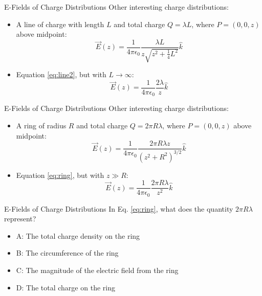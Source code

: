 \documentclass{beamer}
\begin{document}
\begin{frame}{E-Fields of Charge Distributions}
Other interesting charge distributions:
\begin{itemize}
\item A line of charge with length $L$ and total charge $Q = \lambda L$, where $P = (0,0,z)$ above midpoint:
\begin{equation}
\vec{E}(z) = \frac{1}{4\pi\epsilon_0} \frac{\lambda L}{z\sqrt{z^2 + \frac{1}{4} L^2}} \hat{k} \label{eq:line2}
\end{equation}
\item Equation \ref{eq:line2}, but with $L \rightarrow \infty$:
\begin{equation}
\vec{E}(z) = \frac{1}{4\pi\epsilon_0} \frac{2\lambda}{z} \hat{k}
\end{equation}
\end{itemize}
\end{frame}

\begin{frame}{E-Fields of Charge Distributions}
Other interesting charge distributions:
\begin{itemize}
\item A ring of radius $R$ and total charge $Q = 2\pi R\lambda$, where $P = (0,0,z)$ above midpoint:
\begin{equation}
\vec{E}(z) = \frac{1}{4\pi\epsilon_0} \frac{2\pi R \lambda z}{\left(z^2 + R^2\right)^{3/2}} \hat{k} \label{eq:ring}
\end{equation}
\item Equation \ref{eq:ring}, but with $z \gg R$:
\begin{equation}
\vec{E}(z) = \frac{1}{4\pi\epsilon_0} \frac{2\pi R \lambda }{z^2} \hat{k} \label{eq:ring2}
\end{equation}
\end{itemize}
\end{frame}

\begin{frame}{E-Fields of Charge Distributions}
In Eq. \ref{eq:ring}, what does the quantity $2\pi R\lambda$ represent?
\begin{itemize}
\item A: The total charge density on the ring
\item B: The circumference of the ring
\item C: The magnitude of the electric field from the ring
\item D: The total charge on the ring
\end{itemize}
\end{frame}
\end{document}
